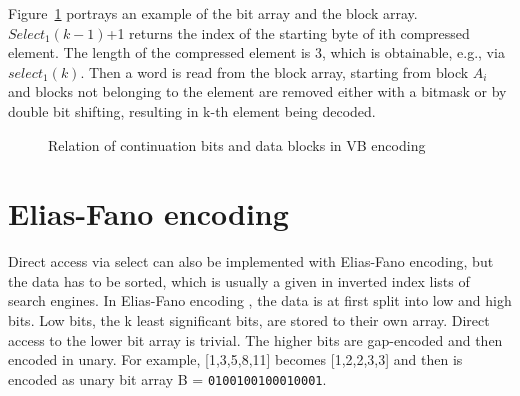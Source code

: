 Figure~\ref{VBarrays} portrays an example of the bit array and the block array. $Select_1(k-1)$+1 returns the index of the starting byte of ith compressed element. The length of the compressed 
element is 3, which is obtainable, e.g., via $select_1(k)$. Then a word is read from the block array, starting from block $A_i$ and blocks not belonging to the element
are removed either with a bitmask or by double bit shifting, resulting in k-th element being decoded.

\begin{figure}[ht]
\centering
{}
\caption{Relation of continuation bits and data blocks in VB encoding} \label{VBarrays}
\end{figure}


\section{Elias-Fano encoding}
Direct access via select can also be implemented with Elias-Fano encoding, but the data has to be sorted, which is usually a given in inverted index lists of search engines. In Elias-Fano encoding \citep{Eli74, Vig13}, 
the data is at first split into low and 
high bits. Low bits, the k least significant bits, are stored to their own array. Direct access to the lower bit array is trivial. The higher bits are gap-encoded and then encoded in unary. 
For example, [1,3,5,8,11] becomes [1,2,2,3,3] and then is encoded as unary bit array B = \texttt{0100100100010001}. 


